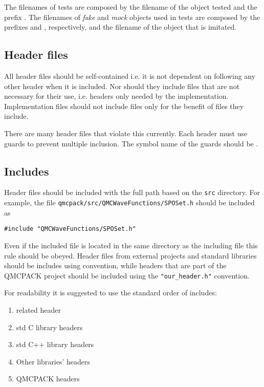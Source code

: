 The filenames of tests are composed by the filename of the object tested and the prefix .
The filenames of \emph{fake} and \emph{mock} objects used in tests are composed by the prefixes  and , respectively, and the filename of the object that is imitated.

\subsection{Header files}
All header files should be self-contained i.e. it is not dependent on following any other header when it is included. Nor should they include files that are not necessary for their use, i.e. headers only needed by the implementation. Implementation files should not include files only for the benefit of files they include.

There are many header files that violate this currently.
Each header must use  guards to prevent multiple inclusion.
The symbol name of the  guards should be .

\subsection{Includes}
Header files should be included with the full path based on the \verb|src| directory.
For example, the file \verb|qmcpack/src/QMCWaveFunctions/SPOSet.h| should be included as
\begin{lstlisting}
#include "QMCWaveFunctions/SPOSet.h"
\end{lstlisting}
Even if the included file is located in the same directory as the including file this rule should be obeyed. Header files from external projects and standard libraries should be includes using  convention, while headers that are part of the QMCPACK project should be included using the \verb|"our_header.h"| convention.

For readability it is suggested to use the standard order of includes:
\begin{enumerate}
	\item related header
	\item std C library headers
	\item std C++ library headers
	\item Other libraries' headers
	\item QMCPACK headers
\end{enumerate}

